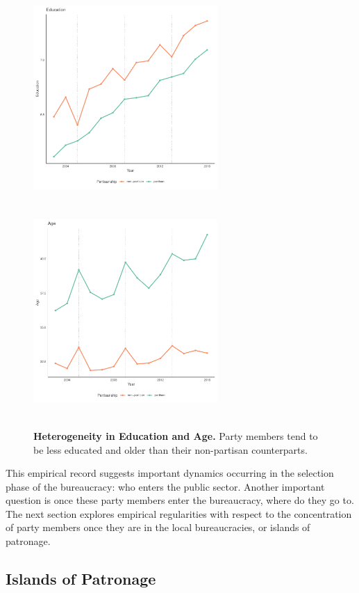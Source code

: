 \documentclass[12pt,a4paper]{article}
\begin{document}
\begin{figure}[H]
    \centering
    \includegraphics[width = 7cm, height = 8cm]{figures/partisanship/plot_edu_mean.pdf}
    \includegraphics[width = 7cm, height = 8cm]{figures/partisanship/plot_age_mean.pdf}
    \caption{\textbf{Heterogeneity in Education and Age.} Party members tend to be less educated and older than their non-partisan counterparts.}
    \label{fig:partisan_edu_et_age}
\end{figure}

This empirical record suggests important dynamics occurring in the selection phase of the bureaucracy: who enters the public sector. Another important question is once these party members enter the bureaucracy, where do they go to. The next section explores empirical regularities with respect to the concentration of party members once they are in the local bureaucracies, or islands of patronage.

\subsection{Islands of Patronage}
\label{sec:prevalence_patronage}
\end{document}
